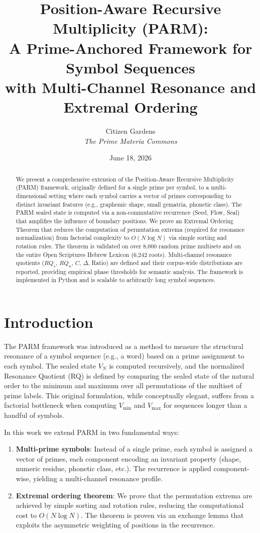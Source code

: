 \documentclass[12pt]{article}
\title{Position-Aware Recursive Multiplicity (PARM):\\
  A Prime-Anchored Framework for Symbol Sequences\\
  with Multi-Channel Resonance and Extremal Ordering}
\author{Citizen Gardens \\  \textit{The Prime Materia Commons}}
\date{June 18, 2026}
\theoremstyle{plain}
\theoremstyle{definition}
\theoremstyle{remark}
\begin{document}
\maketitle

\begin{abstract}
We present a comprehensive extension of the Position-Aware Recursive Multiplicity (PARM) framework, originally defined for a single prime per symbol, to a multi-dimensional setting where each symbol carries a vector of primes corresponding to distinct invariant features (e.g., graphemic shape, small gematria, phonetic class). The PARM sealed state is computed via a non-commutative recurrence (Seed, Flow, Seal) that amplifies the influence of boundary positions. We prove an Extremal Ordering Theorem that reduces the computation of permutation extrema (required for resonance normalization) from factorial complexity to $O(N \log N)$ via simple sorting and rotation rules. The theorem is validated on over 8,000 random prime multisets and on the entire Open Scriptures Hebrew Lexicon (6,242 roots). Multi-channel resonance quotients ($RQ_s$, $RQ_n$, $C$, $\Delta$, Ratio) are defined and their corpus-wide distributions are reported, providing empirical phase thresholds for semantic analysis. The framework is implemented in Python and is scalable to arbitrarily long symbol sequences.
\end{abstract}
\newpage
\tableofcontents
\newpage
\section{Introduction}

The PARM framework \cite{parm} was introduced as a method to measure the structural resonance of a symbol sequence (e.g., a word) based on a prime assignment to each symbol. The sealed state $V_N$ is computed recursively, and the normalized Resonance Quotient (RQ) is defined by comparing the sealed state of the natural order to the minimum and maximum over all permutations of the multiset of prime labels. This original formulation, while conceptually elegant, suffers from a factorial bottleneck when computing $V_{\min}$ and $V_{\max}$ for sequences longer than a handful of symbols.

In this work we extend PARM in two fundamental ways:

\begin{enumerate}
\item \textbf{Multi-prime symbols}: Instead of a single prime, each symbol is assigned a vector of primes, each component encoding an invariant property (shape, numeric residue, phonetic class, etc.). The recurrence is applied component-wise, yielding a multi-channel resonance profile.
\item \textbf{Extremal ordering theorem}: We prove that the permutation extrema are achieved by simple sorting and rotation rules, reducing the computational cost to $O(N \log N)$. The theorem is proven via an exchange lemma that exploits the asymmetric weighting of positions in the recurrence.
\end{enumerate}
\end{document}
